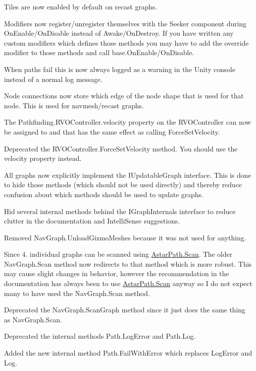 \begin{DoxyItemize}
\begin{DoxyItemize}
\begin{DoxyItemize}
\item Tiles are now enabled by default on recast graphs.
\item Modifiers now register/unregister themselves with the Seeker component during On\+Enable/\+On\+Disable instead of Awake/\+On\+Destroy. If you have written any custom modifiers which defines those methods you may have to add the \textquotesingle{}override\textquotesingle{} modifier to those methods and call base.\+On\+Enable/\+On\+Disable.
\item When paths fail this is now always logged as a warning in the Unity console instead of a normal log message.
\item Node connections now store which edge of the node shape that is used for that node. This is used for navmesh/recast graphs.
\item The Pathfinding.\+R\+V\+O\+Controller.\+velocity property on the R\+V\+O\+Controller can now be assigned to and that has the same effect as calling Force\+Set\+Velocity.
\item Deprecated the R\+V\+O\+Controller.\+Force\+Set\+Velocity method. You should use the velocity property instead.
\item All graphs now explicitly implement the I\+Updatable\+Graph interface. This is done to hide those methods (which should not be used directly) and thereby reduce confusion about which methods should be used to update graphs.
\item Hid several internal methods behind the I\+Graph\+Internals interface to reduce clutter in the documentation and Intelli\+Sense suggestions.
\item Removed Nav\+Graph.\+Unload\+Gizmo\+Meshes because it was not used for anything.
\item Since 4. individual graphs can be scanned using \mbox{\hyperlink{class_astar_path_a9751550dc6954212dcb2e03aecafbcf6}{Astar\+Path.\+Scan}}. The older Nav\+Graph.\+Scan method now redirects to that method which is more robust. This may cause slight changes in behavior, however the recommendation in the documentation has always been to use \mbox{\hyperlink{class_astar_path_a9751550dc6954212dcb2e03aecafbcf6}{Astar\+Path.\+Scan}} anyway so I do not expect many to have used the Nav\+Graph.\+Scan method.
\item Deprecated the Nav\+Graph.\+Scan\+Graph method since it just does the same thing as Nav\+Graph.\+Scan.
\item Deprecated the internal methods Path.\+Log\+Error and Path.\+Log.
\item Added the new internal method Path.\+Fail\+With\+Error which replaces Log\+Error and Log.

\end{DoxyItemize}
\end{DoxyItemize}
\end{DoxyItemize}
